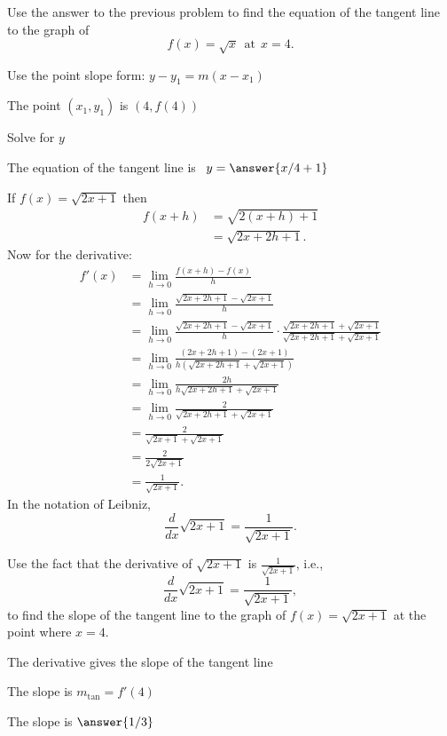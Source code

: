 \documentclass{ximera}
\begin{document}
\begin{problem} %
Use the answer to the previous problem to find the equation of the tangent line to the graph of 
\[
f(x) = \sqrt{x} \ \ \text{at} \ \ x=4.
\]
\begin{hint}
Use the point slope form: $y-y_1 = m(x-x_1)$
\end{hint}
\begin{hint}
The point $(x_1,y_1)$ is $(4, f(4))$
\end{hint}
\begin{hint}
Solve for $y$
\end{hint}
The equation of the tangent line is \ $y = \answer{x/4 +1}$
\end{problem}


\begin{example} %
If $f(x) = \sqrt {2x+1}$ then
\begin{align*}
f(x+h) &= \sqrt{2(x+h)+1} \\
       &= \sqrt{2x +2h+1}.			
\end{align*}
Now for the derivative:
\begin{align*}
f'(x) &= \lim_{h \to 0} \frac{f(x+h)-f(x)}{h}\\[5pt]
&= \lim_{h \to 0} \frac{\sqrt{2x+2h+1}- \sqrt{2x+1}}{h}\\[5pt]
&= \lim_{h \to 0} \frac{\sqrt{2x+2h+1}- \sqrt{2x+1}}{h} \cdot
\frac{\sqrt{2x+2h+1}+ \sqrt{2x+1}}{\sqrt{2x+2h+1}+ \sqrt{2x+1}} \\[5pt]
&= \lim_{h \to 0} \frac{(2x+2h+1) - (2x+1)}{h(\sqrt{2x+2h+1}+ \sqrt{2x+1})}\\[5pt]
&= \lim_{h \to 0} \frac{2h}{h\sqrt{2x+2h+1}+ \sqrt{2x+1}}\\[5pt]
&= \lim_{h \to 0} \frac{2}{\sqrt{2x+2h+1}+ \sqrt{2x+1}}\\[5pt]
&=  \frac{2}{\sqrt{2x+1}+ \sqrt{2x+1}}\\[5pt]
&=  \frac{2}{2\sqrt{2x+1}}\\[5pt]
&=  \displaystyle{\frac{1}{\sqrt{2x+1}}}.
\end{align*}
In the notation of Leibniz, 
\[
\frac{d}{dx}\sqrt{2x+1}= \frac{1}{\sqrt{2x+1}}.
\]

\end{example}


\begin{problem} %
Use the fact that the derivative of $\sqrt{2x+1}$ is $\frac{1}{\sqrt{2x+1}}$,
i.e., 
\[
\frac{d}{dx}\sqrt{2x+1} = \frac{1}{\sqrt{2x+1}},
\]
to find the slope of the tangent line to the graph of 
$f(x) = \sqrt{2x+1}$ at the point where $x = 4$.\\
\begin{hint}
The derivative gives the slope of the tangent line
\end{hint}
\begin{hint}
The slope is $m_{\text{tan}} = f'(4)$
\end{hint}
The slope is $\answer{1/3}$
\end{problem}
\end{document}
